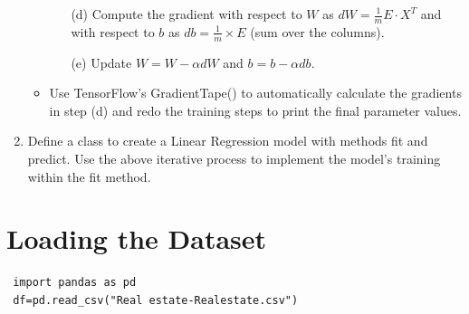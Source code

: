 \begin{enumerate}
\begin{itemize}
\begin{itemize}
        \item[(d)] Compute the gradient with respect to \( W \) as \( dW = \frac{1}{m} E \cdot X^T \) and with respect to \( b \) as \( db = \frac{1}{m} \times E \) (sum over the columns).
        \item[(e)] Update \( W = W - \alpha dW \) and \( b = b - \alpha db \).
    \end{itemize}
    \item Use TensorFlow's GradientTape() to automatically calculate the gradients in step (d) and redo the training steps to print the final parameter values.
\end{itemize}


  \item Define a class to create a Linear Regression model with methods fit and predict. Use the above iterative process to implement the model’s training within the fit method.
\end{enumerate}
\newpage

\vspace{-.15cm}
\section{Loading the Dataset}
\vspace{-.75cm}
\begin{code}
\begin{lstlisting}
 import pandas as pd
 df=pd.read_csv("Real estate-Realestate.csv")
\end{lstlisting}
\end{code}
\vspace{-1cm}
\begin{verbatim} 
\end{verbatim}
\vspace{-.6cm}
